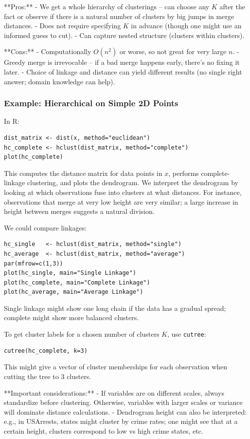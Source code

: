 \documentclass[11pt]{article}
\begin{document}
**Pros:**
- We get a whole hierarchy of clusterings – can choose any $K$ after the fact or observe if there is a natural number of clusters by big jumps in merge distances.
- Does not require specifying $K$ in advance (though one might use an informed guess to cut).
- Can capture nested structure (clusters within clusters).

**Cons:**
- Computationally $O(n^2)$ or worse, so not great for very large $n$.
- Greedy merge is irrevocable – if a bad merge happens early, there's no fixing it later.
- Choice of linkage and distance can yield different results (no single right answer; domain knowledge can help).

\subsubsection*{Example: Hierarchical on Simple 2D Points}
In R:
\begin{verbatim}
dist_matrix <- dist(x, method="euclidean")
hc_complete <- hclust(dist_matrix, method="complete")
plot(hc_complete)
\end{verbatim}
This computes the distance matrix for data points in $x$, performs complete-linkage clustering, and plots the dendrogram. We interpret the dendrogram by looking at which observations fuse into clusters at what distances. For instance, observations that merge at very low height are very similar; a large increase in height between merges suggests a natural division.

We could compare linkages:
\begin{verbatim}
hc_single   <- hclust(dist_matrix, method="single")
hc_average  <- hclust(dist_matrix, method="average")
par(mfrow=c(1,3))
plot(hc_single, main="Single Linkage")
plot(hc_complete, main="Complete Linkage")
plot(hc_average, main="Average Linkage")
\end{verbatim}
Single linkage might show one long chain if the data has a gradual spread; complete might show more balanced clusters.

To get cluster labels for a chosen number of clusters $K$, use \texttt{cutree}:
\begin{verbatim}
cutree(hc_complete, k=3)
\end{verbatim}
This might give a vector of cluster memberships for each observation when cutting the tree to 3 clusters.

**Important considerations:**
- If variables are on different scales, always standardize before clustering. Otherwise, variables with larger scales or variance will dominate distance calculations.
- Dendrogram height can also be interpreted: e.g., in USArrests, states might cluster by crime rates; one might see that at a certain height, clusters correspond to low vs high crime states, etc.
\end{document}
